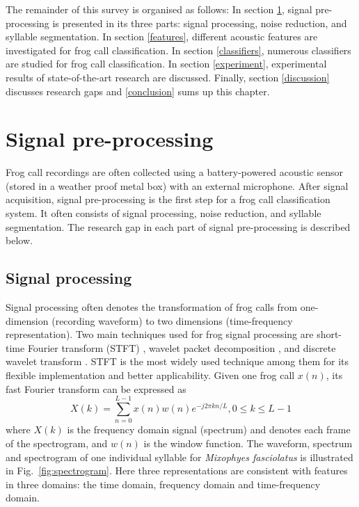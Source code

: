 

The remainder of this survey is organised as follows: In section \ref{pre-processing}, signal pre-processing is presented in its three parts: signal processing, noise reduction, and syllable segmentation. 
In section \ref{features}, different acoustic features are investigated for frog call classification. In section \ref{classifiers}, numerous classifiers are studied for frog call classification. In section \ref{experiment}, experimental results of state-of-the-art research are discussed. Finally, section \ref{discussion} discusses research gaps and \ref{conclusion} sums up this chapter.




\section{Signal pre-processing}
\label{pre-processing}

Frog call recordings are often collected using a battery-powered acoustic sensor (stored in a weather proof metal box) with an external microphone. After signal acquisition,  signal pre-processing is the first step for a frog call classification system.
It often consists of signal processing, noise reduction, and syllable segmentation. The research gap in each part of signal pre-processing is described below.


\subsection{Signal processing}
Signal processing often denotes the transformation of frog calls from one-dimension (recording waveform) to two dimensions (time-frequency representation). Two main techniques used for frog signal processing are short-time Fourier transform (STFT) \citep{huang2009frog, Huang20141, Colonna20157367,  Noda2016100}, wavelet packet decomposition \citep{yen2002automatic}, and discrete wavelet transform \citep{colonna2012feature}. STFT is the most widely used technique among them for its flexible implementation and better applicability. Given one frog call $x(n)$, its fast Fourier transform can be expressed as
\begin{equation}
X(k) = \sum_{n=0}^{L-1}x(n)w(n)e^{-j2 \pi kn/L}, 0 \leq k \leq L-1
\end{equation}
where $X(k)$ is the frequency domain signal (spectrum) and denotes each frame of the spectrogram, and $w(n)$ is the window function. The waveform, spectrum and spectrogram of one individual syllable for \textit{Mixophyes fasciolatus} is illustrated in Fig.~\ref{fig:spectrogram}. Here three representations are consistent with features in three domains: the time domain, frequency domain and time-frequency domain.

